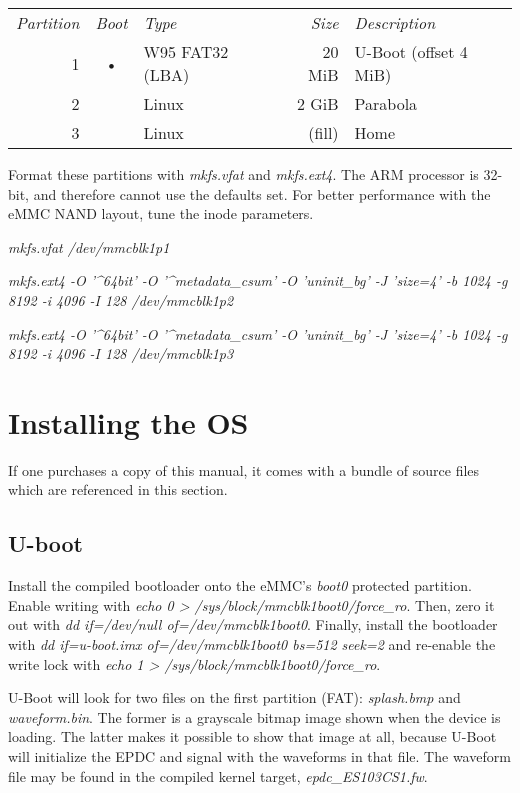 \documentclass{memoir}
\begin{document}
\vspace{0.5cm}
\begin{tabular}{ r | c | l | r | l }
  \textit{Partition} & \textit{Boot} & \textit{Type} & \textit{Size} & \textit{Description} \\
  1 & • & W95 FAT32 (LBA) & 20 MiB & U-Boot (offset 4 MiB)\\
  2 &  & Linux & 2 GiB & Parabola\\
  3 &  & Linux & (fill) & Home
\end{tabular}
\vspace{0.5cm}

Format these partitions with \textit{mkfs.vfat} and \textit{mkfs.ext4}. The ARM processor is 32-bit, and therefore cannot use the defaults set. For better performance with the eMMC NAND layout, tune the inode parameters.

\vspace{0.5cm}
\textit{mkfs.vfat /dev/mmcblk1p1}

\vspace{0.5cm}
\textit{mkfs.ext4 -O '\^{}64bit' -O '\textasciicircum metadata\_csum' -O 'uninit\_bg' -J 'size=4' -b 1024 -g 8192 -i 4096 -I 128 /dev/mmcblk1p2}

\vspace{0.5cm}
\textit{mkfs.ext4 -O '\^{}64bit' -O '\textasciicircum metadata\_csum' -O 'uninit\_bg' -J 'size=4' -b 1024 -g 8192 -i 4096 -I 128 /dev/mmcblk1p3}


\section{Installing the OS}
If one purchases a copy of this manual, it comes with a bundle of source files which are referenced in this section.

\subsection{U-boot}
Install the compiled bootloader onto the eMMC's \textit{boot0} protected partition. Enable writing with \textit{echo 0 > /sys/block/mmcblk1boot0/force\_ro}. Then, zero it out with \textit{dd if=/dev/null of=/dev/mmcblk1boot0}. Finally, install the bootloader with \textit{dd if=u-boot.imx of=/dev/mmcblk1boot0 bs=512 seek=2} and re-enable the write lock with \textit{echo 1 > /sys/block/mmcblk1boot0/force\_ro}.

U-Boot will look for two files on the first partition (FAT): \textit{splash.bmp} and \textit{waveform.bin}. The former is a grayscale bitmap image shown when the device is loading. The latter makes it possible to show that image at all, because U-Boot will initialize the EPDC and signal with the waveforms in that file. The waveform file may be found in the compiled kernel target, \textit{epdc\_ES103CS1.fw}.
\end{document}
